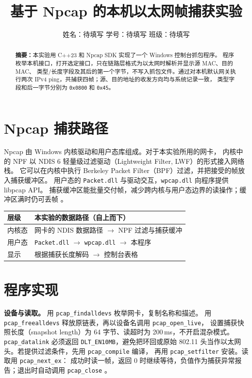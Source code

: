 \documentclass[acmsmall,nonacm]{acmart}
\title{基于 Npcap 的本机以太网帧捕获实验}
\author{姓名：待填写 \texorpdfstring{\quad}{\space}学号：待填写
  \texorpdfstring{\quad}{\space}班级：待填写}
\begin{document}
\begin{abstract}
\textbf{摘要：}本实验用 C++23 和 Npcap SDK 实现了一个 Windows 控制台抓包程序。
程序枚举本机接口，打开选定接口，只在链路层格式为以太网时解析并显示源 MAC、目的 MAC、
类型/长度字段及其后的第一个字节，不写入抓包文件。通过对本机默认网关执行两次
IPv4 ping，共捕获四帧；源、目的地址的收发方向均与系统记录一致，
类型字段和后一字节分别为 \texttt{0x0800} 和 \texttt{0x45}。
\end{abstract}

\maketitle

\section{Npcap 捕获路径}

Npcap 由 Windows 内核驱动和用户态库组成。对于本实验所用的网卡，
内核中的 NPF 以 NDIS 6 轻量级过滤驱动（Lightweight Filter, LWF）的形式接入网络栈。
它可以在内核中执行 Berkeley Packet Filter（BPF）过滤，并把接受的帧放入捕获缓冲区。
用户态的 \texttt{Packet.dll} 与驱动交互，\texttt{wpcap.dll} 向程序提供 libpcap API。
捕获缓冲区能批量交付帧，减少跨内核与用户态边界的读操作；缓冲区满时仍可丢帧
\cite{npcap-internals,bpf}。

\begin{center}
\small
\begin{tabular}{@{}ll@{}}
\toprule
层级 & 本实验的数据路径（自上而下） \\
\midrule
内核态 & 网卡的 NDIS 数据路径 $\rightarrow$ NPF 过滤与捕获缓冲 \\
用户态 & \texttt{Packet.dll} $\rightarrow$ \texttt{wpcap.dll} $\rightarrow$ 本程序 \\
显示 & 根据捕获长度解码 $\rightarrow$ 控制台表格 \\
\bottomrule
\end{tabular}
\end{center}

\section{程序实现}

\textbf{设备与读取。}
用 \texttt{pcap\_findalldevs} 枚举网卡，复制名称和描述。\newline
用 \texttt{pcap\_freealldevs} 释放原链表，再以设备名调用 \texttt{pcap\_open\_live}，
设置捕获快照长度（snapshot length）为 64 字节、读超时为 200\,ms，不开启混杂模式。
\texttt{pcap\_datalink} 必须返回 \texttt{DLT\_EN10MB}，避免把环回或原始
802.11 头当作以太网头。若提供过滤条件，先用 \texttt{pcap\_compile} 编译，
再用 \texttt{pcap\_setfilter} 安装。读取用 \texttt{pcap\_next\_ex}：
成功时读一帧，返回 0 时继续等待，负值作为捕获异常报告；退出时自动调用
\texttt{pcap\_close} \cite{npcap-api,npcap-read}。
\end{document}
